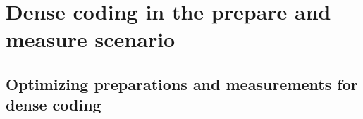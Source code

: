 \chapter{Dense coding in the prepare and measure scenario}
\label{chap:pam-quantum}

    \section{Optimizing preparations and measurements for dense coding}
    \label{sec:pam-quantum-optimization}
